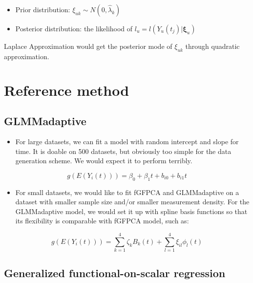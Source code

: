 \documentclass[
]{article}
\providecommand{\tightlist}{%
  \setlength{\itemsep}{0pt}\setlength{\parskip}{0pt}}
\begin{document}
\begin{itemize}
\tightlist
\item
  Prior distribution: \(\xi_{uk} \sim N(0, \hat{\lambda}_k)\)
\item
  Posterior distribution: the likelihood of
  \(l_u =l(Y_u(t_j)|\mathbf{\xi}_u)\)
\end{itemize}

Laplace Approximation would get the posterior mode of \(\xi_{uk}\)
through quadratic approximation.

\hypertarget{reference-method}{%
\section{Reference method}\label{reference-method}}

\hypertarget{glmmadaptive}{%
\subsection{GLMMadaptive}\label{glmmadaptive}}

\begin{itemize}
\tightlist
\item
  For large datasets, we can fit a model with random intercept and slope
  for time. It is doable on 500 datasets, but obviously too simple for
  the data generation scheme. We would expect it to perform terribly.
\end{itemize}

\[g(E(Y_i(t))) = \beta_0+\beta_1t+b_{i0}+b_{i1}t\]

\begin{itemize}
\tightlist
\item
  For small datasets, we would like to fit fGFPCA and GLMMadaptive on a
  dataset with smaller sample size and/or smaller measurement density.
  For the GLMMadaptive model, we would set it up with spline basis
  functions so that its flexibility is comparable with fGFPCA model,
  such as:
\end{itemize}

\[g(E(Y_i(t))) = \sum_{k=1}^4\zeta_{k}B_k(t)+\sum_{l=1}^4\xi_{il}\phi_l(t)\]

\hypertarget{generalized-functional-on-scalar-regression}{%
\subsection{Generalized functional-on-scalar
regression}\label{generalized-functional-on-scalar-regression}}
\end{document}
